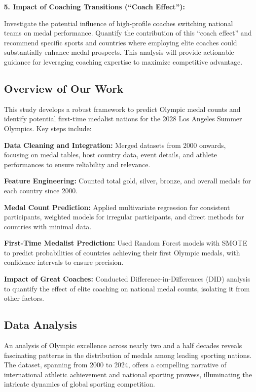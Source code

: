 \documentclass[12pt,a4paper]{article}
\begin{document}
    
    \textbf{5. Impact of Coaching Transitions (``Coach Effect''):}
    
    Investigate the potential influence of high-profile coaches
    switching national teams on medal performance. Quantify the contribution
    of this ``coach effect'' and recommend specific sports and countries
    where employing elite coaches could substantially enhance medal
    prospects. This analysis will provide actionable guidance for leveraging
    coaching expertise to maximize competitive advantage.
    
    \subsection{Overview of Our Work}
    
    This study develops a robust framework to predict Olympic medal
    counts and identify potential first-time medalist nations for the 2028
    Los Angeles Summer Olympics. Key steps include:
    
    \textbf{Data Cleaning and Integration:} Merged datasets from 2000
    onwards, focusing on medal tables, host country data, event details, and
    athlete performances to ensure reliability and relevance.
    
    \textbf{Feature Engineering:} Counted total gold, silver, bronze, and
    overall medals for each country since 2000.
    
    \textbf{Medal Count Prediction:} Applied multivariate regression for
    consistent participants, weighted models for irregular participants, and
    direct methods for countries with minimal data.
    
    \textbf{First-Time Medalist Prediction:} Used Random Forest models with
    SMOTE to predict probabilities of countries achieving their first
    Olympic medals, with confidence intervals to ensure precision.
    
    \textbf{Impact of Great Coaches:} Conducted Difference-in-Differences
    (DID) analysis to quantify the effect of elite coaching on national
    medal counts, isolating it from other factors.
    
    \subsection{Data Analysis}
    
    An analysis of Olympic excellence across nearly two and a half
    decades reveals fascinating patterns in the distribution of medals among
    leading sporting nations. The dataset, spanning from 2000 to 2024,
    offers a compelling narrative of international athletic achievement and
    national sporting prowess, illuminating the intricate dynamics of global
    sporting competition.
    
\end{document}
